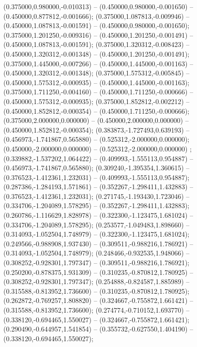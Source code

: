  (0.375000,0.980000,-0.010313) -- (0.450000,0.980000,-0.001650) -- (0.450000,0.877812,-0.001666);
 (0.375000,1.087813,-0.009946) -- (0.450000,1.087813,-0.001591) -- (0.450000,0.980000,-0.001650);
 (0.375000,1.201250,-0.009316) -- (0.450000,1.201250,-0.001491) -- (0.450000,1.087813,-0.001591);
 (0.375000,1.320312,-0.008423) -- (0.450000,1.320312,-0.001348) -- (0.450000,1.201250,-0.001491);
 (0.375000,1.445000,-0.007266) -- (0.450000,1.445000,-0.001163) -- (0.450000,1.320312,-0.001348);
 (0.375000,1.575312,-0.005845) -- (0.450000,1.575312,-0.000935) -- (0.450000,1.445000,-0.001163);
 (0.375000,1.711250,-0.004160) -- (0.450000,1.711250,-0.000666) -- (0.450000,1.575312,-0.000935);
 (0.375000,1.852812,-0.002212) -- (0.450000,1.852812,-0.000354) -- (0.450000,1.711250,-0.000666);
 (0.375000,2.000000,0.000000) -- (0.450000,2.000000,0.000000) -- (0.450000,1.852812,-0.000354);
 (0.383873,-1.727493,0.639193) -- (0.456973,-1.741867,0.565880) -- (0.525312,-2.000000,0.000000);
 (0.450000,-2.000000,0.000000) -- (0.525312,-2.000000,0.000000) ;
 (0.339882,-1.537202,1.064422) -- (0.409993,-1.555113,0.954887) -- (0.456973,-1.741867,0.565880);
 (0.309240,-1.395354,1.360615) -- (0.376523,-1.412361,1.232031) -- (0.409993,-1.555113,0.954887);
 (0.287386,-1.284193,1.571861) -- (0.352267,-1.298411,1.432883) -- (0.376523,-1.412361,1.232031);
 (0.271745,-1.193430,1.723046) -- (0.334706,-1.204089,1.578295) -- (0.352267,-1.298411,1.432883);
 (0.260786,-1.116629,1.828978) -- (0.322300,-1.123475,1.681024) -- (0.334706,-1.204089,1.578295);
 (0.253577,-1.049483,1.898660) -- (0.314093,-1.052504,1.748979) -- (0.322300,-1.123475,1.681024);
 (0.249566,-0.988908,1.937430) -- (0.309511,-0.988216,1.786921) -- (0.314093,-1.052504,1.748979);
 (0.248466,-0.932535,1.948066) -- (0.308252,-0.928301,1.797347) -- (0.309511,-0.988216,1.786921);
 (0.250200,-0.878375,1.931309) -- (0.310235,-0.870812,1.780925) -- (0.308252,-0.928301,1.797347);
 (0.254888,-0.824587,1.885989) -- (0.315588,-0.813952,1.736600) -- (0.310235,-0.870812,1.780925);
 (0.262872,-0.769257,1.808820) -- (0.324667,-0.755872,1.661421) -- (0.315588,-0.813952,1.736600);
 (0.274774,-0.710152,1.693770) -- (0.338120,-0.694465,1.550027) -- (0.324667,-0.755872,1.661421);
 (0.290490,-0.644957,1.541854) -- (0.355732,-0.627550,1.404190) -- (0.338120,-0.694465,1.550027);

